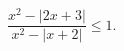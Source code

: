 \begin{ex}[type=inequality]
	\begin{condition}
		$\dfrac{x^2 - \big|2x + 3\big|}{x^2 - \big|x + 2\big|}\leqslant1 .$
	\end{condition}
\end{ex}